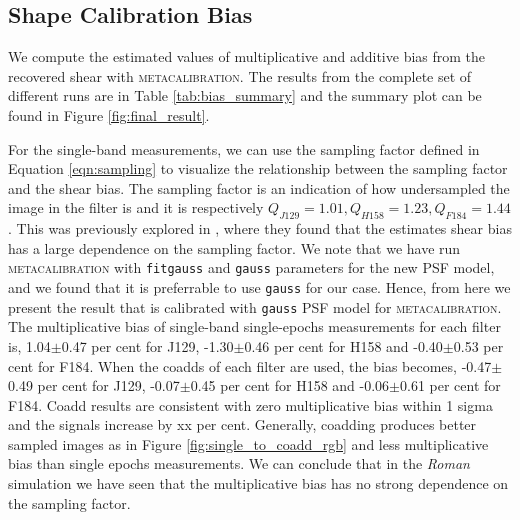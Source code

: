 \documentclass[fleqn,usenatbib]{mnras}
\begin{document}
\subsection{Shape Calibration Bias}
\label{subsec:shapes}
We compute the estimated values of multiplicative and additive bias from the recovered shear with \textsc{metacalibration}. The results from the complete set of different runs are in Table \ref{tab:bias_summary} and the summary plot can be found in Figure \ref{fig:final_result}.  

For the single-band measurements, we can use the sampling factor defined in Equation \ref{eqn:sampling} to visualize the relationship between the sampling factor and the shear bias. The sampling factor is an indication of how undersampled the image in the filter is and it is respectively $Q_{J129}=1.01, Q_{H158}=1.23, Q_{F184}=1.44$. This was previously explored in \citealt{2021MNRAS.502.4048K}, where they found that the estimates shear bias has a large dependence on the sampling factor. We note that we have run \textsc{metacalibration} with \texttt{fitgauss} and \texttt{gauss} parameters for the new PSF model, and we found that it is preferrable to use \texttt{gauss} for our case. Hence, from here we present the result that is calibrated with \texttt{gauss} PSF model for \textsc{metacalibration}. The multiplicative bias of single-band single-epochs measurements for each filter is, 1.04$\pm$0.47 per cent for J129, -1.30$\pm$0.46 per cent for H158 and -0.40$\pm$0.53 per cent for F184. When the coadds of each filter are used, the bias becomes, -0.47$\pm$0.49 per cent for J129, -0.07$\pm$0.45 per cent for H158 and -0.06$\pm$0.61 per cent for F184. Coadd results are consistent with zero multiplicative bias within 1 sigma and the signals increase by xx per cent. Generally, coadding produces better sampled images as in Figure \ref{fig:single_to_coadd_rgb} and less multiplicative bias than single epochs measurements. We can conclude that in the \emph{Roman} simulation we have seen that the multiplicative bias has no strong dependence on the sampling factor.
\end{document}
